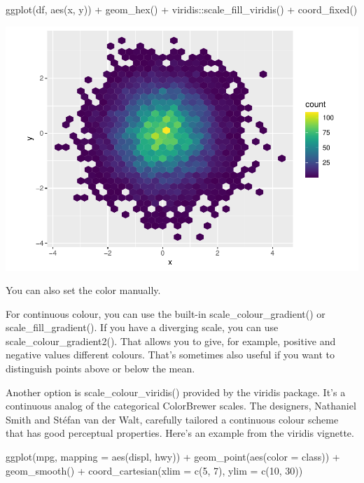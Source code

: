 \documentclass[
]{article}
\newenvironment{Shaded}{\begin{snugshade}}{\end{snugshade}}
\newcommand{\AttributeTok}[1]{\textcolor[rgb]{0.77,0.63,0.00}{#1}}
\newcommand{\DecValTok}[1]{\textcolor[rgb]{0.00,0.00,0.81}{#1}}
\newcommand{\FunctionTok}[1]{\textcolor[rgb]{0.00,0.00,0.00}{#1}}
\newcommand{\NormalTok}[1]{#1}
\newcommand{\SpecialCharTok}[1]{\textcolor[rgb]{0.00,0.00,0.00}{#1}}
\begin{document}
\begin{Shaded}
\begin{Highlighting}[]
\FunctionTok{ggplot}\NormalTok{(df, }\FunctionTok{aes}\NormalTok{(x, y)) }\SpecialCharTok{+}
  \FunctionTok{geom\_hex}\NormalTok{() }\SpecialCharTok{+}
\NormalTok{  viridis}\SpecialCharTok{::}\FunctionTok{scale\_fill\_viridis}\NormalTok{() }\SpecialCharTok{+}
  \FunctionTok{coord\_fixed}\NormalTok{()}
\end{Highlighting}
\end{Shaded}

\includegraphics{Journal_files/figure-latex/unnamed-chunk-66-3.pdf}

You can also set the color manually.

For continuous colour, you can use the built-in
scale\_colour\_gradient() or scale\_fill\_gradient(). If you have a
diverging scale, you can use scale\_colour\_gradient2(). That allows you
to give, for example, positive and negative values different colours.
That's sometimes also useful if you want to distinguish points above or
below the mean.

Another option is scale\_colour\_viridis() provided by the viridis
package. It's a continuous analog of the categorical ColorBrewer scales.
The designers, Nathaniel Smith and Stéfan van der Walt, carefully
tailored a continuous colour scheme that has good perceptual properties.
Here's an example from the viridis vignette.

\begin{Shaded}
\begin{Highlighting}[]
\FunctionTok{ggplot}\NormalTok{(mpg, }\AttributeTok{mapping =} \FunctionTok{aes}\NormalTok{(displ, hwy)) }\SpecialCharTok{+}
  \FunctionTok{geom\_point}\NormalTok{(}\FunctionTok{aes}\NormalTok{(}\AttributeTok{color =}\NormalTok{ class)) }\SpecialCharTok{+}
  \FunctionTok{geom\_smooth}\NormalTok{() }\SpecialCharTok{+}
  \FunctionTok{coord\_cartesian}\NormalTok{(}\AttributeTok{xlim =} \FunctionTok{c}\NormalTok{(}\DecValTok{5}\NormalTok{, }\DecValTok{7}\NormalTok{), }\AttributeTok{ylim =} \FunctionTok{c}\NormalTok{(}\DecValTok{10}\NormalTok{, }\DecValTok{30}\NormalTok{))}
\end{Highlighting}
\end{Shaded}
\end{document}
